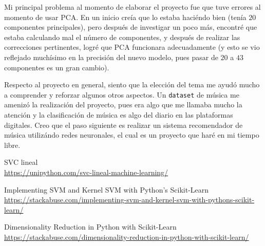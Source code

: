 \documentclass[letterpaper,11pt]{article}
\begin{document}
Mi principal problema al momento de elaborar el proyecto fue que tuve errores 
al momento de usar PCA. En un inicio creía que lo estaba haciéndo bien (tenía 
$20$ componentes principales), pero después de investigar un poco más, 
encontré que estaba calculando mal el número de componentes, y después de 
realizar las correcciones pertinentes, logré que PCA funcionara adecuadamente
(y esto se vio reflejado muchísimo en la precisión del nuevo modelo, pues 
pasar de $20$ a $43$ componentes es un gran cambio).

Respecto al proyecto en general, siento que la elección del tema me ayudó mucho 
a comprender y reforzar algunos otros aspectos. Un \texttt{dataset} de música 
me amenizó la realización del proyecto, pues era algo que me llamaba mucho la 
atención y la clasificación de música es algo del diario en las plataformas 
digitales. Creo que el paso siguiente es realizar un sistema recomendador de 
música utilizándo redes neuronales, el cual es un proyecto que haré en mi 
tiempo libre.

\newpage
\begin{thebibliography}{9} 
    SVC lineal \\
    \url{https://unipython.com/svc-lineal-machine-learning/}

    Implementing SVM and Kernel SVM with Python's Scikit-Learn \\ 
    \url{https://stackabuse.com/implementing-svm-and-kernel-svm-with-pythons-scikit-learn/}

    Dimensionality Reduction in Python with Scikit-Learn \\ 
    \url{https://stackabuse.com/dimensionality-reduction-in-python-with-scikit-learn/}
\end{thebibliography}
\end{document}
